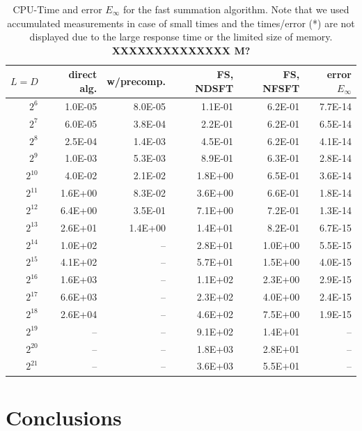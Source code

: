 \documentclass[11pt,a4paper,twoside,bibtotoc]{scrartcl}
\theoremstyle{plain}
\theoremstyle{definition}
\theoremstyle{remark}
\numberwithin{equation}{section}
\numberwithin{table}{section}
\numberwithin{figure}{section}
\begin{document}
\begin{table}[ht!]
  \begin{center}
    \begin{tabular}{r|r|r|r|r|r}
        $L = D$ & direct alg. & w/precomp. & FS, NDSFT & FS, NFSFT & error $E_{\infty}$\\\hline
           $2^6$ & 1.0E-05 & 8.0E-05 & 1.1E-01 & 6.2E-01 & 7.7E-14\\
           $2^7$ & 6.0E-05 & 3.8E-04 & 2.2E-01 & 6.2E-01 & 6.5E-14\\
           $2^8$ & 2.5E-04 & 1.4E-03 & 4.5E-01 & 6.2E-01 & 4.1E-14\\
           $2^9$ & 1.0E-03 & 5.3E-03 & 8.9E-01 & 6.3E-01 & 2.8E-14\\
      $2^{10}$ & 4.0E-02 & 2.1E-02 & 1.8E+00 & 6.5E-01 & 3.6E-14\\
      $2^{11}$ & 1.6E+00 & 8.3E-02 & 3.6E+00 & 6.6E-01 & 1.8E-14\\
      $2^{12}$ & 6.4E+00 & 3.5E-01 & 7.1E+00 & 7.2E-01 & 1.3E-14\\
      $2^{13}$ & 2.6E+01 & 1.4E+00 & 1.4E+01 & 8.2E-01 & 6.7E-15\\
     $2^{14}$ & 1.0E+02 & -- & 2.8E+01 & 1.0E+00 & 5.5E-15\\
     $2^{15}$ & 4.1E+02 & -- & 5.7E+01 & 1.5E+00 & 4.0E-15\\
     $2^{16}$ & 1.6E+03 & -- & 1.1E+02 & 2.3E+00 & 2.9E-15\\
     $2^{17}$ & 6.6E+03 & -- & 2.3E+02 & 4.0E+00 & 2.4E-15\\
     $2^{18}$ & 2.6E+04 & -- & 4.6E+02 & 7.5E+00 & 1.9E-15\\
     $2^{19}$ & -- & -- & 9.1E+02 & 1.4E+01 & --\\
     $2^{20}$ & -- & -- & 1.8E+03 & 2.8E+01 & --\\
     $2^{21}$ & -- & -- & 3.6E+03 & 5.5E+01 & --\\
    \end{tabular}
  \end{center}
  \caption{CPU-Time and error $E_{\infty}$ for the fast summation algorithm.
    Note that we used accumulated measurements in case of small times and the
    times/error (*) are not displayed due to the large response time or the 
    limited size of memory. {\bf XXXXXXXXXXXXXX M?}}
  \label{tab:TimeSpace}
\end{table}


\section{Conclusions}
\end{document}

